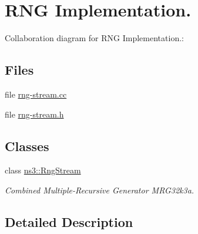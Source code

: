 \hypertarget{group__rngimpl}{}\section{R\+NG Implementation.}
\label{group__rngimpl}
Collaboration diagram for R\+NG Implementation.\+:
\subsection*{Files}
\begin{DoxyCompactItemize}
\item 
file \hyperlink{rng-stream_8cc}{rng-\/stream.\+cc}
\item 
file \hyperlink{rng-stream_8h}{rng-\/stream.\+h}
\end{DoxyCompactItemize}
\subsection*{Classes}
\begin{DoxyCompactItemize}
\item 
class \hyperlink{classns3_1_1RngStream}{ns3\+::\+Rng\+Stream}
\begin{DoxyCompactList}\small\item\em Combined Multiple-\/\+Recursive Generator M\+R\+G32k3a. \end{DoxyCompactList}\end{DoxyCompactItemize}


\subsection{Detailed Description}
